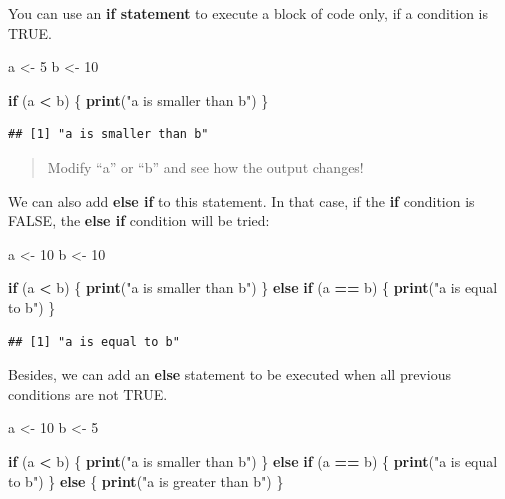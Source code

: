 \documentclass[
]{book}
\newenvironment{Shaded}{\begin{snugshade}}{\end{snugshade}}
\newcommand{\ControlFlowTok}[1]{\textcolor[rgb]{0.13,0.29,0.53}{\textbf{#1}}}
\newcommand{\DecValTok}[1]{\textcolor[rgb]{0.00,0.00,0.81}{#1}}
\newcommand{\FunctionTok}[1]{\textcolor[rgb]{0.13,0.29,0.53}{\textbf{#1}}}
\newcommand{\NormalTok}[1]{#1}
\newcommand{\OtherTok}[1]{\textcolor[rgb]{0.56,0.35,0.01}{#1}}
\newcommand{\SpecialCharTok}[1]{\textcolor[rgb]{0.81,0.36,0.00}{\textbf{#1}}}
\newcommand{\StringTok}[1]{\textcolor[rgb]{0.31,0.60,0.02}{#1}}
\begin{document}
You can use an \textbf{if statement} to execute a block of code only, if a condition is TRUE.

\begin{Shaded}
\begin{Highlighting}[]
\NormalTok{a }\OtherTok{\textless{}{-}} \DecValTok{5}
\NormalTok{b }\OtherTok{\textless{}{-}} \DecValTok{10}

\ControlFlowTok{if}\NormalTok{ (a }\SpecialCharTok{\textless{}}\NormalTok{ b) \{}
  \FunctionTok{print}\NormalTok{(}\StringTok{"a is smaller than b"}\NormalTok{)}
\NormalTok{\}}
\end{Highlighting}
\end{Shaded}

\begin{verbatim}
## [1] "a is smaller than b"
\end{verbatim}

\begin{quote}
Modify ``a'' or ``b'' and see how the output changes!
\end{quote}

We can also add \textbf{else if} to this statement.
In that case, if the \textbf{if} condition is FALSE, the \textbf{else if} condition will be tried:

\begin{Shaded}
\begin{Highlighting}[]
\NormalTok{a }\OtherTok{\textless{}{-}} \DecValTok{10}
\NormalTok{b }\OtherTok{\textless{}{-}} \DecValTok{10}

\ControlFlowTok{if}\NormalTok{ (a }\SpecialCharTok{\textless{}}\NormalTok{ b) \{}
  \FunctionTok{print}\NormalTok{(}\StringTok{"a is smaller than b"}\NormalTok{)}
\NormalTok{\} }\ControlFlowTok{else} \ControlFlowTok{if}\NormalTok{ (a }\SpecialCharTok{==}\NormalTok{ b) \{}
  \FunctionTok{print}\NormalTok{(}\StringTok{"a is equal to b"}\NormalTok{)}
\NormalTok{\}}
\end{Highlighting}
\end{Shaded}

\begin{verbatim}
## [1] "a is equal to b"
\end{verbatim}

Besides, we can add an \textbf{else} statement to be executed when all previous conditions are not TRUE.

\begin{Shaded}
\begin{Highlighting}[]
\NormalTok{a }\OtherTok{\textless{}{-}} \DecValTok{10}
\NormalTok{b }\OtherTok{\textless{}{-}} \DecValTok{5}

\ControlFlowTok{if}\NormalTok{ (a }\SpecialCharTok{\textless{}}\NormalTok{ b) \{}
  \FunctionTok{print}\NormalTok{(}\StringTok{"a is smaller than b"}\NormalTok{)}
\NormalTok{\} }\ControlFlowTok{else} \ControlFlowTok{if}\NormalTok{ (a }\SpecialCharTok{==}\NormalTok{ b) \{}
  \FunctionTok{print}\NormalTok{(}\StringTok{"a is equal to b"}\NormalTok{)}
\NormalTok{\} }\ControlFlowTok{else}\NormalTok{ \{}
  \FunctionTok{print}\NormalTok{(}\StringTok{"a is greater than b"}\NormalTok{)}
\NormalTok{\}}
\end{Highlighting}
\end{Shaded}
\end{document}
